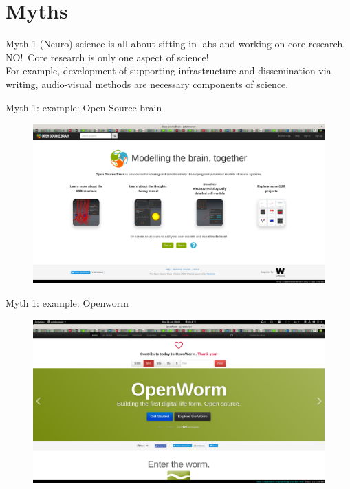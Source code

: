 \section{Myths}
\begin{frame}[c]{Myth 1}
  (Neuro) science is all about sitting in labs and working on core research.\\
  \vspace{0.5cm}
  \pause{}
  NO!\ Core research is only one aspect of science!\\
  \vspace{0.2cm}
  For example, development of supporting infrastructure and dissemination via writing, audio-visual methods are necessary components of science.
\end{frame}
\begin{frame}[c]{Myth 1: example: Open Source brain}
  \begin{figure}[h]
    \centering
    \includegraphics[width=\linewidth]{images/OSB.png}
  \end{figure}
\end{frame}
\begin{frame}[c]{Myth 1: example: Openworm }
  \begin{figure}[h]
    \centering
    \includegraphics[width=\linewidth]{images/openworm.png}
  \end{figure}
\end{frame}
